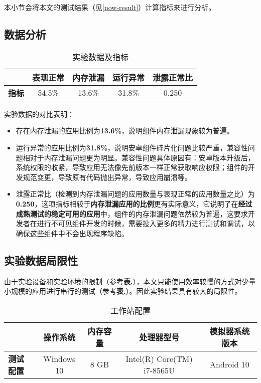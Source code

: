 本小节会将本文的测试结果（见\ref{now-result}）计算指标来进行分析。

\subsection{数据分析}
\begin{table}[htb]\footnotesize
	\centering
	\caption{实验数据及指标}
	\vspace{2mm}
	\begin{tabular}{lcccc}
		\toprule
		&\textbf{表现正常}&\textbf{内存泄漏}&\textbf{运行异常}&\textbf{泄露正常比}\\
		\midrule
		\textbf{指标}&54.5\%&13.6\%&31.8\%&0.250\\
		\bottomrule
	\end{tabular}
	\label{table:compare}
\end{table}

实验数据的对比表明：
\begin{itemize}
	\item 存在内存泄漏的应用比例为\textbf{13.6\%}，说明组件内存泄漏现象较为普遍。
	\item 运行异常的应用比例为\textbf{31.8\%}，说明安卓组件碎片化问题比较严重，兼容性问题相对于内存泄漏问题更为明显。兼容性问题具体原因有：安卓版本升级后，系统权限的收紧，导致应用无法像先前版本一样正常获取响应权限；组件的开发规范变更，导致原有代码抛出异常，导致应用崩溃等。
	\item 泄露正常比（检测到内存泄漏问题的应用数量与表现正常的应用数量之比）为\textbf{0.250}，这项指标相较于\textbf{内存泄漏应用的比例}更有实际意义，它说明了在\textbf{经过成熟测试的稳定可用的应用}中，组件的内存泄漏问题依然较为普遍，这要求开发者在进行不可见组件开发的时候，需要投入更多的精力进行测试和调试，以确保这些组件中不会出现程序缺陷。
\end{itemize}

\subsection{实验数据局限性}

由于实验设备和实验环境的限制（参考\textbf{表.}\redbf{\ref{table:pc-compare}}），本文只能使用效率较慢的方式对少量小规模的应用进行串行的测试（参考\textbf{表.}\redbf{\ref{table:method-compare}}）。因此实验结果具有较大的局限性。
\newline

\begin{table}[htb]\footnotesize
	\centering
	\caption{工作站配置}
	\vspace{2mm}
	\begin{tabular}{lcccc}
		\toprule
		&\textbf{操作系统}&\textbf{内存容量}&\textbf{处理器型号}&\textbf{模拟器系统版本}\\
		\midrule
		\textbf{测试配置}&Windows 10&8 GB&Intel(R) Core(TM) i7-8565U&Android 10\\
		\bottomrule
	\end{tabular}
	\label{table:pc-compare}
\end{table}

